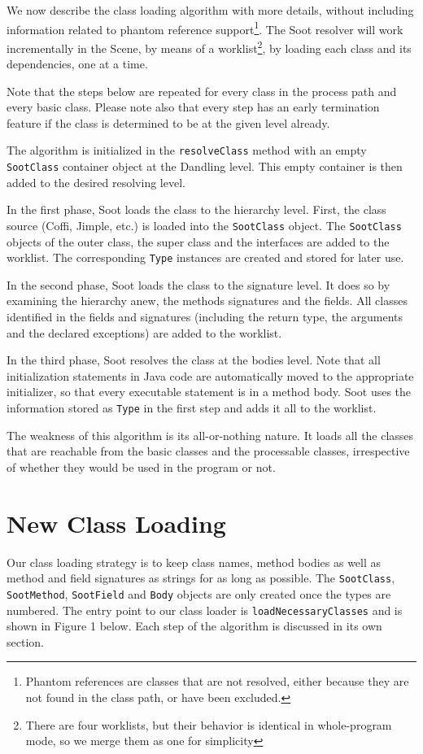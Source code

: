 \documentclass[preprint]{sigplanconf}
\begin{document}
We now describe the class loading algorithm with more details, without including information related to phantom reference support\footnote{Phantom references are classes that are not resolved, either because they are not found in the class path, or have been excluded.}.
The Soot resolver will work incrementally in the Scene, by means of a worklist\footnote{There are four worklists, but their behavior is identical in whole-program mode, so we merge them as one for simplicity}, by loading each class and its dependencies, one at a time.

Note that the steps below are repeated for every class in the process path and every basic class. Please note also that every step has an early termination feature if the class is determined to be at the given level already.

The algorithm is initialized in the {\tt resolveClass} method with an empty {\tt SootClass} container object at the Dandling level. This empty container is then added to the desired resolving level.

In the first phase, Soot loads the class to the hierarchy level. First, the class source (Coffi, Jimple, etc.) is loaded into the {\tt SootClass} object.
The {\tt SootClass} objects of the outer class, the super class and the interfaces are added to the worklist. The corresponding {\tt Type} instances are created and stored for later use.

In the second phase, Soot loads the class to the signature level. It does so by examining the hierarchy anew, the methods signatures and the fields. All classes identified in the fields and signatures (including the return type, the arguments and the declared exceptions) are added to the worklist.

In the third phase, Soot resolves the class at the bodies level. Note that all initialization statements in Java code are automatically moved to the appropriate initializer, so that every executable statement is in a method body. Soot uses the information stored as {\tt Type} in the first step and adds it all to the worklist.

The weakness of this algorithm is its all-or-nothing nature. It loads all the classes that are reachable from the basic classes and the processable classes, irrespective of whether they would be used in the program or not.


\section{New Class Loading}
\label{sec:new-cl}
Our class loading strategy is to keep class names, method bodies as well as method and field signatures as strings for as long as possible. The {\tt SootClass}, {\tt SootMethod}, {\tt SootField} and {\tt Body} objects are only created once the types are numbered. The entry point to our class loader is {\tt loadNecessaryClasses} and is shown in Figure 1 below. Each step of the algorithm is discussed in its own section.
\end{document}
